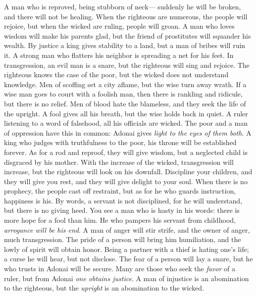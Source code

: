 \begin{biblechapter} %
\verse A man who is reproved, being stubborn of neck— 
suddenly he will be broken, and there will not be healing.
\verse When the righteous are numerous, the people will rejoice, 
but when the wicked are ruling, people will groan.
\verse A man who loves wisdom will make his parents glad, 
but the friend of prostitutes will squander his wealth.
\verse By justice a king gives stability to a land, 
but a man of bribes will ruin it.
\verse A strong man who flatters his neighbor 
is spreading a net for his feet.
\verse In transgression, an evil man is a snare, 
but the righteous will sing and rejoice.
\verse The righteous knows the case of the poor, 
but the wicked does not understand knowledge.
\verse Men of scoffing set a city aflame, 
but the wise turn away wrath.
\verse If a wise man goes to court with a foolish man, 
then there is rankling and ridicule, but there is no relief.
\verse Men of blood hate the blameless, 
and they seek the life of the upright.
\verse A fool gives all his breath, 
but the wise holds back in quiet.
\verse A ruler listening to a word of falsehood, 
all his officials are wicked.
\verse The poor and a man of oppression have this in common: 
Adonai gives \textit{light to the eyes of them both}.
\verse A king who judges with truthfulness to the poor, 
his throne will be established forever.
\verse As for a rod and reproof, they will give wisdom, 
but a neglected child is disgraced by his mother.
\verse With the increase of the wicked, transgression will increase, 
but the righteous will look on his downfall.
\verse Discipline your children, and they will give you rest, 
and they will give delight to your soul.
\verse When there is no prophecy, the people cast off restraint, 
but as for he who guards instruction, happiness is his.
\verse By words, a servant is not disciplined, 
for he will understand, but there is no giving heed.
\verse You see a man who is hasty in his words: 
there is more hope for a fool than him.
\verse He who pampers his servant from childhood, 
\textit{arrogance will be his end}.
\verse A man of anger will stir strife, 
and the owner of anger, much transgression.
\verse The pride of a person will bring him humiliation, 
and the lowly of spirit will obtain honor.
\verse Being a partner with a thief is hating one’s life; 
a curse he will hear, but not disclose.
\verse The fear of a person will lay a snare, 
but he who trusts in Adonai will be secure.
\verse Many are those who seek the \textit{favor} of a ruler, 
but from Adonai \textit{one obtains justice}.
\verse A man of injustice is an abomination to the righteous, 
but the \textit{upright} is an abomination to the wicked.
\end{biblechapter}


